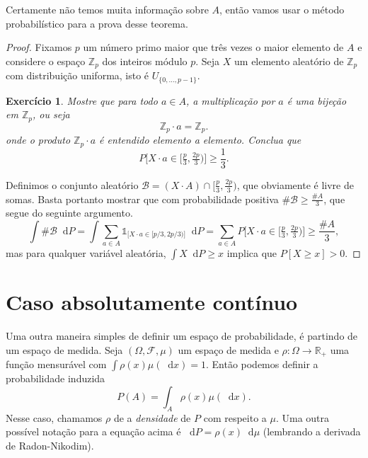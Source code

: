 \documentclass[reqno, final]{book}
\newcommand*\1{\mathds{1}}
\newtheorem{exercise}[example]{Exercício}
\renewcommand*\d{\mathop{}\!\mathrm{d}}
\begin{document}
Certamente não temos muita informação sobre $A$, então vamos usar o método probabilístico para a prova desse teorema.

\begin{proof}
  Fixamos $p$ um número primo maior que três vezes o maior elemento de $A$ e considere o espaço $\mathbb{Z}_p$ dos inteiros módulo $p$.
  Seja $X$ um elemento aleatório de $\mathbb{Z}_p$ com distribuição uniforma, isto é $U_{\{0, \dots, p-1\}}$.
  \begin{exercise}
    Mostre que para todo $a \in A$, a multiplicação por $a$ é uma bijeção em $\mathbb{Z}_p$, ou seja
    \begin{equation}
      \mathbb{Z}_p \cdot a = \mathbb{Z}_p.
    \end{equation}
    onde o produto $\mathbb{Z}_p \cdot a$ é entendido elemento a elemento.
    Conclua que
    \begin{equation}
      P \Big[ X \cdot a \in \big[\tfrac p3, \tfrac {2p}3\big) \Big] \geq \frac 13.
    \end{equation}
  \end{exercise}
  Definimos o conjunto aleatório $\mathcal{B} = (X \cdot A) \cap [\tfrac p3, \tfrac {2p}3)$, que obviamente é livre de somas.
  Basta portanto mostrar que com probabilidade positiva $\# \mathcal{B} \geq \tfrac{\#A}3$, que segue do seguinte argumento.
  \begin{equation*}
    \int \# \mathcal{B} \d P = \int \sum_{a \in A} \1_{\big[ X \cdot a \in [p/3, 2p/3) \big]} \d P = \sum_{a \in A} P \Big[ X \cdot a \in \big[\tfrac p3, \tfrac {2p}3\big) \Big] \geq \frac{\# A}3,
  \end{equation*}
  mas para qualquer variável aleatória, $\int X \d P \geq x$ implica que $P[X \geq x] > 0$.
\end{proof}





\vfill
\pagebreak


\section{Caso absolutamente contínuo}

Uma outra maneira simples de definir um espaço de probabilidade, é partindo de um espaço de medida.
Seja $(\Omega, \mathcal{F}, \mu)$ um espaço de medida e $\rho:\Omega \to \mathbb{R}_+$ uma função mensurável com $\int \rho(x) \mu(\d x) = 1$.
Então podemos definir a probabilidade induzida
\begin{equation}
  \label{e:absolutamente_cont}
  P(A) = \int_A \rho(x) \mu(\d x).
\end{equation}
Nesse caso, chamamos $\rho$ de a \emph{densidade}  de $P$ com respeito a $\mu$.
Uma outra possível notação para a equação acima é $\d P = \rho(x) \d \mu$ \index{dP@$\d P = \rho \d \mu$} (lembrando a derivada de Radon-Nikodim).
\end{document}
